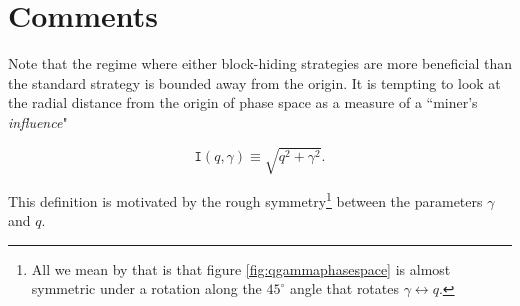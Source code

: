 \documentclass[letterpaper,12pt]{report}
\begin{document}
\noindent%
\begin{minipage}{\linewidth}
\label{fig:qgammaphasespace}
\end{minipage}
\linebreak

\section{Comments}

Note that the regime where either block-hiding strategies are more beneficial than the standard strategy is bounded away from the origin. It is tempting to look at the radial distance from the origin of phase space as a measure of a ``miner's \textit{influence}" 

\begin{equation}
\mathtt{I}(q,\gamma)\equiv \sqrt{q^2+\gamma^2}.
\end{equation}


This definition is motivated by the rough symmetry\footnote{All we mean by that is that figure \ref{fig:qgammaphasespace} is almost symmetric under a rotation along the $45^{\circ}$ angle that rotates $\gamma \leftrightarrow q$.} between the parameters $\gamma$ and $q$.
\end{document}
